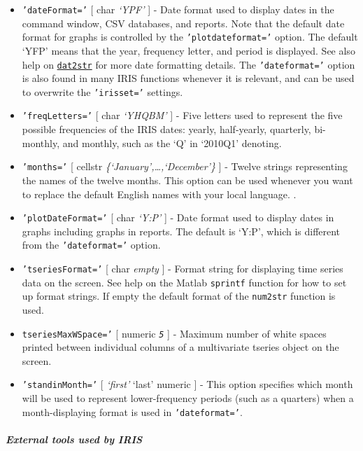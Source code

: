 \begin{itemize}
\item
  \texttt{'dateFormat='} {[} char \textbar{} \emph{`YPF'} {]} - Date
  format used to display dates in the command window, CSV databases, and
  reports. Note that the default date format for graphs is controlled by
  the \texttt{'plotdateformat='} option. The default `YFP' means that
  the year, frequency letter, and period is displayed. See also help on
  \href{dates/dat2str}{\texttt{dat2str}} for more date formatting
  details. The \texttt{'dateformat='} option is also found in many IRIS
  functions whenever it is relevant, and can be used to overwrite the
  \texttt{'irisset='} settings.
\item
  \texttt{'freqLetters='} {[} char \textbar{} \emph{`YHQBM'} {]} - Five
  letters used to represent the five possible frequencies of the IRIS
  dates: yearly, half-yearly, quarterly, bi-monthly, and monthly, such
  as the `Q' in `2010Q1' denoting.
\item
  \texttt{'months='} {[} cellstr \textbar{}
  \emph{\{`January',\ldots{},`December'\}} {]} - Twelve strings
  representing the names of the twelve months. This option can be used
  whenever you want to replace the default English names with your local
  language. .
\item
  \texttt{'plotDateFormat='} {[} char \textbar{} \emph{`Y:P'} {]} - Date
  format used to display dates in graphs including graphs in reports.
  The default is `Y:P', which is different from the
  \texttt{'dateformat='} option.
\item
  \texttt{'tseriesFormat='} {[} char \textbar{} \emph{empty} {]} -
  Format string for displaying time series data on the screen. See help
  on the Matlab \texttt{sprintf} function for how to set up format
  strings. If empty the default format of the \texttt{num2str} function
  is used.
\item
  \texttt{tseriesMaxWSpace='} {[} numeric \textbar{} \emph{\texttt{5}}
  {]} - Maximum number of white spaces printed between individual
  columns of a multivariate tseries object on the screen.
\item
  \texttt{'standinMonth='} {[} \emph{`first'} \textbar{} `last'
  \textbar{} numeric {]} - This option specifies which month will be
  used to represent lower-frequency periods (such as a quarters) when a
  month-displaying format is used in \texttt{'dateformat='}.
\end{itemize}

\subparagraph{External tools used by
IRIS}\label{external-tools-used-by-iris}

